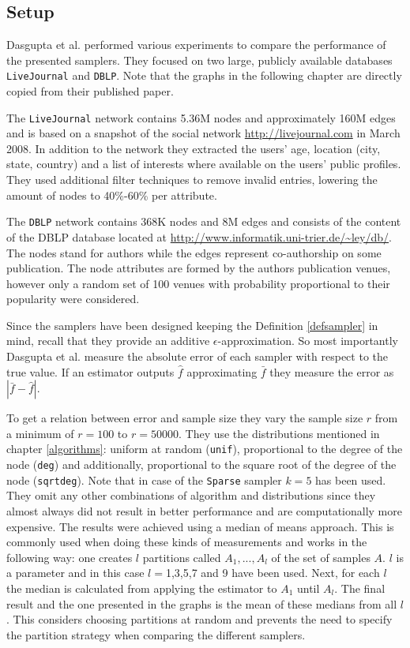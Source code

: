 \subsection{Setup}
Dasgupta et al. \cite{dasgupta2012social} performed various experiments to compare the performance of the presented samplers.
They focused on two large, publicly available databases \texttt{LiveJournal} and \texttt{DBLP}.
Note that the graphs in the following chapter are directly copied from their published paper.

The \texttt{LiveJournal} network contains 5.36M nodes and approximately 160M edges and is based on a snapshot of the social network \url{http://livejournal.com} in March 2008. In addition to the network they extracted the users' age, location (city, state, country) and a list of interests where available on the users' public profiles. They used additional filter techniques to remove invalid entries, lowering the amount of nodes to 40\%-60\% per attribute.

The \texttt{DBLP} network contains 368K nodes and 8M edges and consists of the content of the DBLP database located at \url{http://www.informatik.uni-trier.de/~ley/db/}. The nodes stand for authors while the edges represent co-authorship on some publication. The node attributes are formed by the authors publication venues, however only a random set of 100 venues with probability proportional to their popularity were considered. 

Since the samplers have been designed keeping the Definition \ref{defsampler} in mind, recall that they provide an additive $\epsilon$-approximation. So most importantly Dasgupta et al. measure the absolute error of each sampler with respect to the true value. If an estimator outputs $\hat{f}$ approximating $\bar{f}$ they measure the error as $|\bar{f}-\hat{f}|$.

To get a relation between error and sample size they vary the sample size $r$ from a minimum of $r = 100$ to $r = 50000$. They use the distributions mentioned in chapter \ref{algorithms}: uniform at random (\texttt{unif}), proportional to the degree of the node (\texttt{deg}) and additionally, proportional to the square root of the degree of the node (\texttt{sqrtdeg}). Note that in case of the \texttt{Sparse} sampler $k = 5$ has been used.
They omit any other combinations of algorithm and distributions since they almost always did not result in better performance and are computationally more expensive. 
The results were achieved using a median of means approach. This is commonly used when doing these kinds of measurements and works in the following way: one creates $l$ partitions called $A_1,...,A_l$ of the set of samples $A$. $l$ is a parameter and in this case $l = $1,3,5,7 and 9 have been used. Next, for each $l$ the median is calculated from applying the estimator to $A_1$ until $A_l$. The final result and the one presented in the graphs is the mean of these medians from all $l$.
This considers choosing partitions at random and prevents the need to specify the partition strategy when comparing the different samplers.

